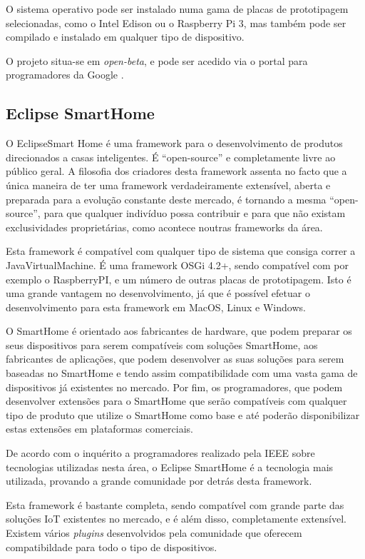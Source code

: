 O sistema operativo pode ser instalado numa gama de placas de prototipagem selecionadas, como o Intel Edison ou o Raspberry Pi 3, mas também pode ser compilado e instalado em qualquer tipo de dispositivo.

O projeto situa-se em \textit{open-beta}, e pode ser acedido via o portal para programadores da Google \cite{android-things}.

\subsection{Eclipse SmartHome}

O EclipseSmart Home é uma framework para o desenvolvimento de produtos direcionados a casas inteligentes. É “open-source” e completamente livre ao público geral. A filosofia dos criadores desta framework assenta no facto que a única maneira de ter uma framework verdadeiramente extensível, aberta e preparada para a evolução constante deste mercado, é tornando a mesma “open-source”, para que qualquer indivíduo possa contribuir e para que não existam exclusividades proprietárias, como acontece noutras frameworks da área.

Esta framework é compatível com qualquer tipo de sistema que consiga correr a JavaVirtualMachine. É uma framework OSGi 4.2+, sendo compatível com por exemplo o RaspberryPI, e um número de outras placas de prototipagem. Isto é uma grande vantagem no desenvolvimento, já que é possível efetuar o desenvolvimento para esta framework em MacOS, Linux e Windows.


O SmartHome é orientado aos fabricantes de hardware, que podem preparar os seus dispositivos para serem compatíveis com soluções SmartHome, aos fabricantes de aplicações, que podem desenvolver as suas soluções para serem baseadas no SmartHome e tendo assim compatibilidade com uma vasta gama de dispositivos já existentes no mercado. Por fim, os programadores, que podem desenvolver extensões para o SmartHome que serão compatíveis com qualquer tipo de produto que utilize o SmartHome como base e até poderão disponibilizar estas extensões em plataformas comerciais.

De acordo com o inquérito \cite{ieeesurvey} a programadores realizado pela IEEE sobre tecnologias utilizadas nesta área, o Eclipse SmartHome é a tecnologia mais utilizada, provando a grande comunidade por detrás desta framework.

Esta framework é bastante completa, sendo compatível com grande parte das soluções IoT existentes no mercado, e é além disso, completamente extensível. Existem vários \textit{plugins} desenvolvidos pela comunidade que oferecem compatibildade para todo o tipo de dispositivos.

